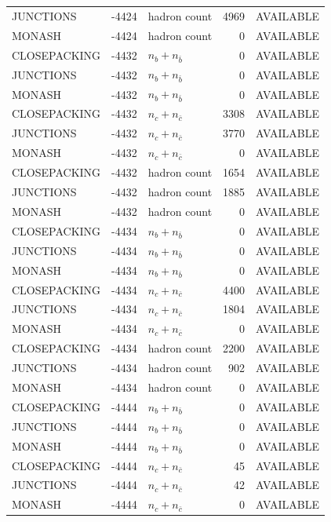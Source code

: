 \begin{landscape}
\begin{longtable}{@{}lrlrl@{}}
JUNCTIONS & -4424 & hadron count & \num{4969} & AVAILABLE \\
MONASH & -4424 & hadron count & \num{0} & AVAILABLE \\
CLOSEPACKING & -4432 & $n_b+n_{\bar b}$ & \num{0} & AVAILABLE \\
JUNCTIONS & -4432 & $n_b+n_{\bar b}$ & \num{0} & AVAILABLE \\
MONASH & -4432 & $n_b+n_{\bar b}$ & \num{0} & AVAILABLE \\
CLOSEPACKING & -4432 & $n_c+n_{\bar c}$ & \num{3308} & AVAILABLE \\
JUNCTIONS & -4432 & $n_c+n_{\bar c}$ & \num{3770} & AVAILABLE \\
MONASH & -4432 & $n_c+n_{\bar c}$ & \num{0} & AVAILABLE \\
CLOSEPACKING & -4432 & hadron count & \num{1654} & AVAILABLE \\
JUNCTIONS & -4432 & hadron count & \num{1885} & AVAILABLE \\
MONASH & -4432 & hadron count & \num{0} & AVAILABLE \\
CLOSEPACKING & -4434 & $n_b+n_{\bar b}$ & \num{0} & AVAILABLE \\
JUNCTIONS & -4434 & $n_b+n_{\bar b}$ & \num{0} & AVAILABLE \\
MONASH & -4434 & $n_b+n_{\bar b}$ & \num{0} & AVAILABLE \\
CLOSEPACKING & -4434 & $n_c+n_{\bar c}$ & \num{4400} & AVAILABLE \\
JUNCTIONS & -4434 & $n_c+n_{\bar c}$ & \num{1804} & AVAILABLE \\
MONASH & -4434 & $n_c+n_{\bar c}$ & \num{0} & AVAILABLE \\
CLOSEPACKING & -4434 & hadron count & \num{2200} & AVAILABLE \\
JUNCTIONS & -4434 & hadron count & \num{902} & AVAILABLE \\
MONASH & -4434 & hadron count & \num{0} & AVAILABLE \\
CLOSEPACKING & -4444 & $n_b+n_{\bar b}$ & \num{0} & AVAILABLE \\
JUNCTIONS & -4444 & $n_b+n_{\bar b}$ & \num{0} & AVAILABLE \\
MONASH & -4444 & $n_b+n_{\bar b}$ & \num{0} & AVAILABLE \\
CLOSEPACKING & -4444 & $n_c+n_{\bar c}$ & \num{45} & AVAILABLE \\
JUNCTIONS & -4444 & $n_c+n_{\bar c}$ & \num{42} & AVAILABLE \\
MONASH & -4444 & $n_c+n_{\bar c}$ & \num{0} & AVAILABLE \\

\end{longtable}
\end{landscape}
